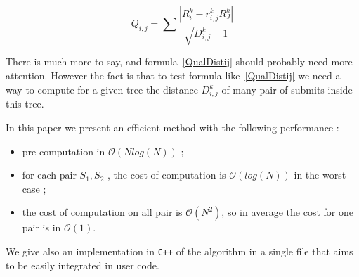 \documentclass[a4paper]{article}
\begin{document}
\begin{equation}
   Q_{i,j} = \sum \frac{|R^k_i - r^k_{i,j} R^k_J|}{\sqrt{D^k_{i,j}-1}} \label{QualDistij}
\end{equation}

There is much more to say, and formula~\ref{QualDistij} should probably
need more attention.  However the fact is that to test formula like~\ref{QualDistij}
we need a way to compute for a given tree the distance $D^k_{i,j}$ of many pair
of submits inside this tree.

In this paper we present an efficient  method with the following performance :

\begin{itemize}
   \item pre-computation in $\mathcal{O}(N log(N))$ ;
   \item for each pair $S_1,S_2$ , the cost of computation is $\mathcal{O}(log(N))$ in the worst case ;
   \item the cost of computation on all pair is $\mathcal{O}(N^2)$, so in average 
         the cost for one pair is in $\mathcal{O}(1)$.
\end{itemize}

We give also an implementation in {\tt C++} of the algorithm in a single file that aims
to be easily integrated in user code.

\end{document}
